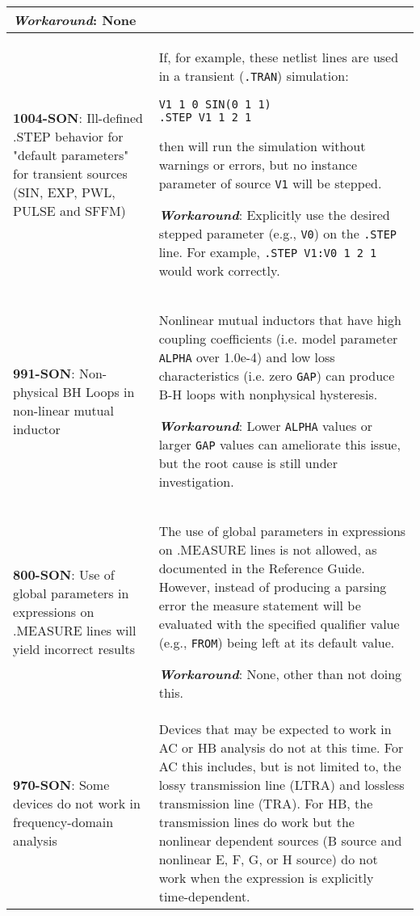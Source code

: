 {\begin{longtable}[h] {>{\raggedright\small}m{2in}|>{\raggedright\let\\\tabularnewline\small}m{3.5in}}
\textbf{\textit{Workaround}}: None
\\ \hline

\textbf{1004-SON}: Ill-defined .STEP behavior for "default parameters" for
transient sources (SIN, EXP, PWL, PULSE and SFFM) &
If, for example, these netlist lines are used in a transient
(\texttt{.TRAN}) simulation:
\begin{verbatim}
V1 1 0 SIN(0 1 1)
.STEP V1 1 2 1
\end{verbatim}
then \Xyce{} will run the simulation without warnings or errors, but
no instance parameter of source \texttt{V1} will be stepped.

\textbf{\textit{Workaround}}: Explicitly use the desired stepped parameter
(e.g., \texttt{V0}) on the \texttt{.STEP} line.  For example,
\texttt{.STEP V1:V0 1 2 1} would work correctly.
\\ \hline

\textbf{991-SON}: Non-physical BH Loops in non-linear mutual inductor &
Nonlinear mutual inductors that have high coupling coefficients (i.e.
model parameter \texttt{ALPHA} over 1.0e-4) and low loss
characteristics (i.e. zero \texttt{GAP}) can produce B-H loops with
nonphysical hysteresis.

\textbf{\textit{Workaround}}: Lower \texttt{ALPHA} values or larger
\texttt{GAP} values can ameliorate this issue, but the root cause is
still under investigation.
\\ \hline

\textbf{800-SON}: Use of global parameters in expressions on .MEASURE lines
will yield incorrect results & The use of global parameters in
expressions on .MEASURE lines is not allowed, as documented in
the \Xyce{} Reference Guide.  However, instead of producing a parsing
error the measure statement will be evaluated with the specified
qualifier value (e.g., \texttt{FROM}) being left at its default value.

\textbf{\textit{Workaround}}: None, other than not doing this.
\\ \hline

\textbf{970-SON}: Some devices do not work in frequency-domain analysis &
Devices that may be expected to work in AC or HB analysis do not at
this time.  For AC this includes, but is not limited to, the lossy
transmission line (LTRA) and lossless transmission line (TRA).  For
HB, the transmission lines do work but the nonlinear dependent sources
(B source and nonlinear E, F, G, or H source) do not work when the
expression is explicitly time-dependent.


\end{longtable}}
